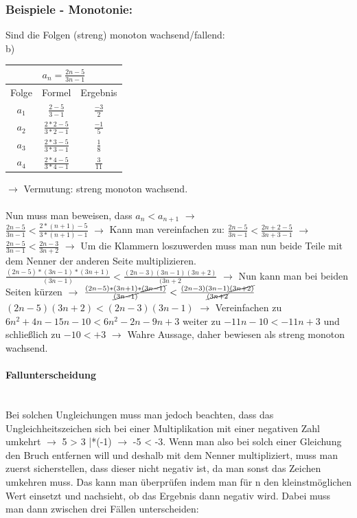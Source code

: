 \documentclass{article}
\newcommand{\paragraphlb}[1]{\paragraph{#1}\mbox{}\\}
\begin{document}
	\subsubsection{Beispiele - Monotonie:}
	Sind die Folgen (streng) monoton wachsend/fallend: \\
	b) \\
	\begin{tabular}{| c | c | c |}
		\toprule
		\multicolumn{3}{|c|}{$a_n=\frac{2n-5}{3n-1}$} \\ \hline
		Folge & Formel & Ergebnis \\ \midrule
		$a_1$ & $\frac{2-5}{3-1}$ & $\frac{-3}{2}$ \\
		$a_2$ & $\frac{2*2-5}{3*2-1}$ & $\frac{-1}{5}$ \\
		$a_3$ & $\frac{2*3-5}{3*3-1}$ & $\frac{1}{8}$ \\
		$a_4$ & $\frac{2*4-5}{3*4-1}$ & $\frac{3}{11}$ \\
		\bottomrule
	\end{tabular}
	$\to$ Vermutung: streng monoton wachsend. \\ \\
	Nun muss man beweisen, dass $a_n<a_{n+1}$ $\to$ \\
	$\frac{2n-5}{3n-1} < \frac{2*(n+1)-5}{3*(n+1)-1}$ $\to$ Kann man vereinfachen zu: $\frac{2n-5}{3n-1} < \frac{2n+2-5}{3n+3-1}$ $\to$ $\frac{2n-5}{3n-1} < \frac{2n-3}{3n+2}$ $\to$ Um die Klammern loszuwerden muss man nun beide Teile mit dem Nenner der anderen Seite multiplizieren. \\
	$\frac{(2n-5)*(3n-1)*(3n+1)}{(3n-1)}<\frac{(2n-3)(3n-1)(3n+2)}{(3n+2}$ $\to$ Nun kann man bei beiden Seiten kürzen $\to$ 
	$\frac{(2n-5)*(3n+1)*\cancel{(3n-1)}}{\cancel{(3n-1)}}<\frac{(2n-3)(3n-1)\cancel{(3n+2)}}{\cancel{(3n+2}}$ \\
	$(2n-5)(3n+2)<(2n-3)(3n-1)$ $\to$ Vereinfachen zu $6n^2+4n-15n-10<6n^2-2n-9n+3$ weiter zu $-11n-10<-11n+3$ und schließlich zu $-10<+3$ $\to$ Wahre Aussage, daher bewiesen als streng monoton wachsend. \\
	\paragraphlb{Fallunterscheidung}
	Bei solchen Ungleichungen muss man jedoch beachten, dass das Ungleichheitszeichen sich bei einer Multiplikation mit einer negativen Zahl umkehrt $\to$ 5 > 3 |*(-1) $\to$ -5 < -3. Wenn man also bei solch einer Gleichung den Bruch entfernen will und deshalb mit dem Nenner multipliziert, muss man zuerst sicherstellen, dass dieser nicht negativ ist, da man sonst das Zeichen umkehren muss. Das kann man überprüfen indem man für n den kleinstmöglichen Wert einsetzt und nachsieht, ob das Ergebnis dann negativ wird. Dabei muss man dann zwischen drei Fällen unterscheiden:
\end{document}
